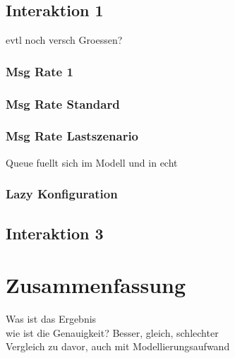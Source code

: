 \subsection{Interaktion 1}
evtl noch versch Groessen?
\subsubsection{Msg Rate 1}
\subsubsection{Msg Rate Standard}
\subsubsection{Msg Rate Lastszenario}
Queue fuellt sich im Modell und in echt
\subsubsection{Lazy Konfiguration}

\subsection{Interaktion 3}


\section{Zusammenfassung}
Was ist das Ergebnis \\
wie ist die Genauigkeit? Besser, gleich, schlechter\\
Vergleich zu davor, auch mit Modellierungsaufwand \\


